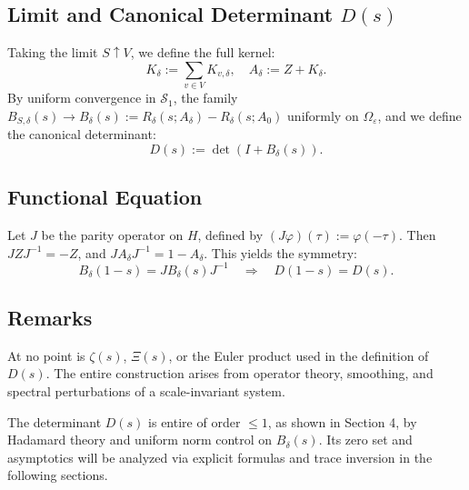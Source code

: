 \subsection{Limit and Canonical Determinant \( D(s) \)}

Taking the limit \( S \uparrow V \), we define the full kernel:
\[
K_\delta := \sum_{v \in V} K_{v,\delta}, \quad A_\delta := Z + K_\delta.
\]
By uniform convergence in \( \mathcal{S}_1 \), the family \( B_{S,\delta}(s) \to B_\delta(s) := R_\delta(s; A_\delta) - R_\delta(s; A_0) \) uniformly on \( \Omega_\varepsilon \), and we define the canonical determinant:
\[
D(s) := \det \left( I + B_\delta(s) \right).
\]

\subsection{Functional Equation}

Let \( J \) be the parity operator on \( H \), defined by \( (J\varphi)(\tau) := \varphi(-\tau) \). Then \( J Z J^{-1} = -Z \), and \( J A_\delta J^{-1} = 1 - A_\delta \). This yields the symmetry:
\[
B_\delta(1 - s) = J B_\delta(s) J^{-1} \quad \Rightarrow \quad D(1 - s) = D(s).
\]

\subsection{Remarks}

\begin{remark}
At no point is \( \zeta(s) \), \( \Xi(s) \), or the Euler product used in the definition of \( D(s) \). The entire construction arises from operator theory, smoothing, and spectral perturbations of a scale-invariant system.
\end{remark}

\begin{remark}
The determinant \( D(s) \) is entire of order \( \leq 1 \), as shown in Section 4, by Hadamard theory and uniform norm control on \( B_\delta(s) \). Its zero set and asymptotics will be analyzed via explicit formulas and trace inversion in the following sections.
\end{remark}